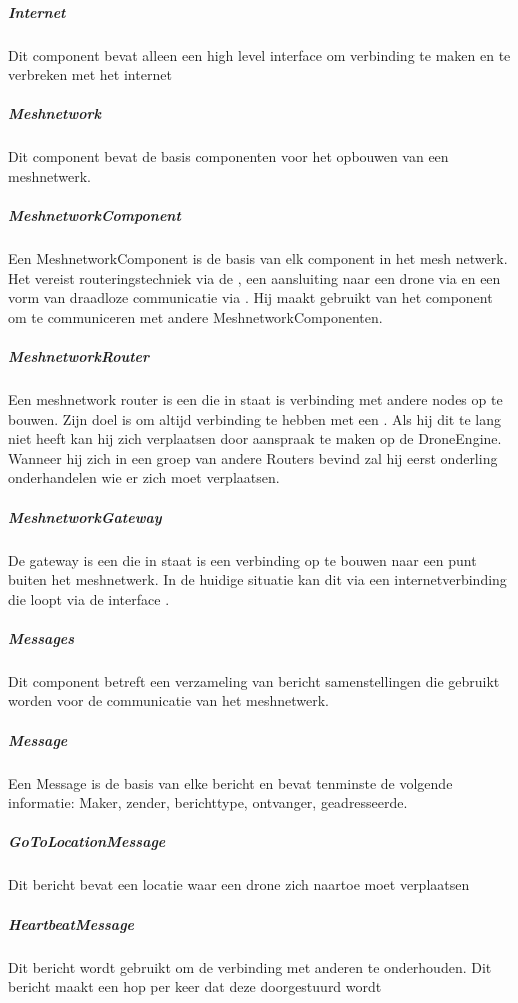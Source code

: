 \documentclass[a4paper, 11pt, oneside]{report}
\begin{document}
\subparagraph{Internet}
\label{architectural:subcomponenten:Internet}
Dit component bevat alleen een high level interface om verbinding te maken en te verbreken met het internet
\subparagraph{Meshnetwork}
\label{architectural:subcomponenten:Meshnetwork}
Dit component bevat de basis componenten voor het opbouwen van een meshnetwerk.
\subparagraph{MeshnetworkComponent}
\label{architectural:subcomponenten:MeshnetworkComponent}
Een MeshnetworkComponent is de basis van elk component in het mesh netwerk.
Het vereist routeringstechniek via de , een aansluiting naar een drone via  en een vorm van draadloze communicatie via .  Hij maakt gebruikt van het component  om te communiceren met andere MeshnetworkComponenten. 
\subparagraph{MeshnetworkRouter}
\label{architectural:subcomponenten:MeshnetworkRouter}
Een meshnetwork router is een  die in staat is verbinding met andere nodes op te bouwen. Zijn doel is om altijd verbinding te hebben met een . Als hij dit te lang niet heeft kan hij zich verplaatsen door aanspraak te maken op de DroneEngine. Wanneer hij zich in een groep van andere Routers bevind zal hij eerst onderling onderhandelen wie er zich moet verplaatsen.
\subparagraph{MeshnetworkGateway}
\label{architectural:subcomponenten:MeshnetworkGateway}
De gateway is een  die in staat is een verbinding op te bouwen naar een punt buiten het meshnetwerk. In de huidige situatie kan dit via een internetverbinding die loopt via de interface . 
\subparagraph{Messages}
\label{architectural:subcomponenten:Messages}
Dit component betreft een verzameling van bericht samenstellingen die gebruikt worden voor de communicatie van het meshnetwerk.
\subparagraph{Message}
\label{architectural:subcomponenten:Message}
Een Message is de basis van elke bericht en bevat tenminste de volgende informatie:  Maker, zender, berichttype, ontvanger, geadresseerde. 
\subparagraph{GoToLocationMessage}
\label{architectural:subcomponenten:GoToLocationMessage}
Dit bericht bevat een locatie waar een drone zich naartoe moet verplaatsen
\subparagraph{HeartbeatMessage}
\label{architectural:subcomponenten:HeartbeatMessage}
Dit bericht wordt gebruikt om de verbinding met anderen te onderhouden. Dit bericht maakt een hop per keer dat deze doorgestuurd wordt
\end{document}
